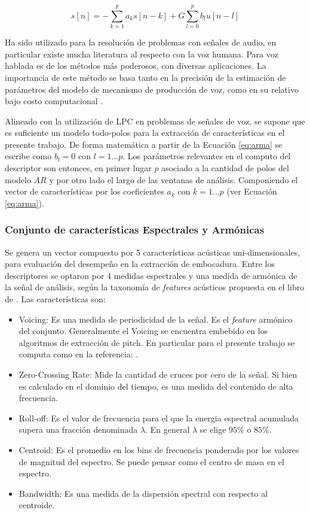 \documentclass{article}
\begin{document}
\begin{equation}
\label{eq:arma}
s[n]=-\sum_{k=1}^p a_ks[n-k]+G\sum_{l=0}^p b_lu[n-l]
\end{equation}

Ha sido utilizado para la resolución de problemas con señales de audio, en particular existe mucha literatura al respecto con la voz humana. Para voz hablada es de los métodos más poderosos, con diversas aplicaciones. La importancia de este método se basa tanto en la precisión de la estimación de parámetros del modelo de mecanismo de producción de voz, como en su relativo bajo costo computacional \citep[Capítulos~3 y 9]{rabiner1978digital}. 
\medskip

Alineado con la utilización de LPC en problemas de señales de voz, se supone que es suficiente un modelo todo-polos para la extracción de características en el presente trabajo. De forma matemática a partir de la Ecuación \ref{eq:arma} se escribe como $b_l=0$ con $l=1...p$. Los parámetros relevantes en el computo del descriptor son entonces, en primer lugar $p$ asociado a la cantidad de polos del modelo $AR$ y por otro lado el largo de las ventanas de análisis. Componiendo el vector de características por los coeficientes $a_k$ con $k=1...p$ (ver Ecuación \ref{eq:arma}).

\subsubsection{Conjunto de características Espectrales y Armónicas} 
Se genera un vector compuesto por 5 características acústicas uni-dimensionales, para evaluación del desempeño en la extracción de embocadura. Entre los descriptores se optaron por 4 medidas espectrales y una medida de armónica de la señal de análisis, según la taxonomía de \textit{features} acústicos propuesta en el libro de \cite{klapuri2007signal}. Las características son: 

\begin{itemize}
	\item Voicing: Es una medida de periodicidad de la señal. Es el \textit{feature} armónico del conjunto. Generalmente el Voicing se encuentra embebido en los algoritmos de extracción de pitch. En particular para el presente trabajo se computa como en la referencia: \cite{de2002yin}.   
	\item Zero-Crossing Rate: Mide la cantidad de cruces por cero de la señal. Si bien es calculado en el dominio del tiempo, es una medida del contenido de alta frecuencia.
	\item Roll-off: Es el valor de frecuencia para el que la energia espectral acumulada supera una fracción denominada $\lambda$. En general $\lambda$ se elige $95\%$ o $85\%$. 
	\item Centroid: Es el promedio en los bins de frecuencia ponderado por los valores de magnitud del espectro. Se puede pensar como el centro de masa en el espectro. 
	\item Bandwidth: Es una medida de la dispersión spectral con respecto al centroide.
\end{itemize}
\end{document}
